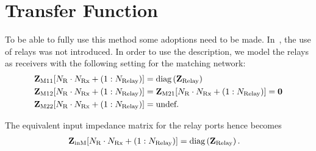 \section{Transfer Function}
To be able to fully use this method some adoptions need to be made.
In~\cite{Nossek}, the use of relays was not introduced.
In order to use the description, we model the relays as receivers with the following setting for the matching network:	
\begin{align}
\label{eq:nossek_matching}
\mat{Z}_\text{M11}[N_\text{R}\cdot N_\text{Rx}+\left(1:N_\text{Relay}\right)] &=
	\text{diag}\left(\vec{Z}_\text{Relay}\right)\\
\mat{Z}_\text{M12}[N_\text{R}\cdot N_\text{Rx}+\left(1:N_\text{Relay}\right)] &= 
	\mat{Z}_\text{M21}[N_\text{R}\cdot N_\text{Rx}+\left(1:N_\text{Relay}\right)] = \mat{0}\\
\mat{Z}_\text{M22}[N_\text{R}\cdot N_\text{Rx}+\left(1:N_\text{Relay}\right)] &= \text{undef.}%
\end{align}

The equivalent input impedance matrix for the relay ports hence becomes
\begin{align}
\label{eq:nossek_matching}
\mathbf{Z}_\text{inM}[N_\text{R}\cdot N_\text{Rx}+\left(1:N_\text{Relay}\right)] &= \text{diag}\left(\mathbf{Z}_\text{Relay}\right).
\end{align}

